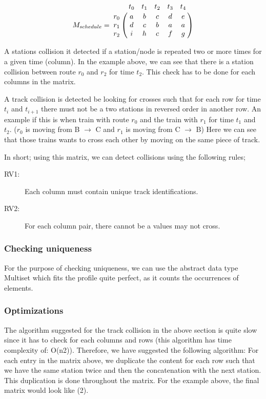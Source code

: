 \documentclass[10pt,a4paper]{article}
\begin{document}
\begin{equation}
M_{schedule} = \bordermatrix{
                    ~ & t_0 & t_1 & t_2 & t_3 & t_4 \cr
                  r_0 & a   & b   & c   & d   & e\cr
                  r_1 & d   & c   & b   & a   & a\cr
                  r_2 & i   & h   & c   & f   & g}
\end{equation}

A stations collision it detected if a station/node is repeated two or more times for a given time (column).
In the example above, we can see that there is a station collision between route $r_0$ and $r_2$ for time $t_2$.
This check has to be done for each columns in the matrix.
 
A track collision is detected be looking for crosses such that for each row for time $t_i$ and $t_{i+1}$ there must not be a two stations in reversed order in another row.
An example if this is when train with route $r_0$ and the train with $r_1$ for time $t_1$ and $t_2$. ($r_0$ is moving from B $\rightarrow$ C and $r_1$ is moving from C $\rightarrow$ B) Here we can see that those trains wants to cross each other by moving on the same piece of track.  

In short; using this matrix, we can detect collisions using the following rules;

\begin{description}
  \item[RV1:] Each column must contain unique track identifications.
  \item[RV2:] For each column pair, there cannot be a values may not cross.
\end{description}

\subsubsection{Checking uniqueness}
For the purpose of checking uniqueness, we can use the abstract data type Multiset which fits the profile quite perfect, as it counts the occurrences of elements. 
\subsubsection{Optimizations}
 
The algorithm suggested for the track collision in the above section is quite slow since it has to check for each columns and rows (this algorithm has time complexity of: O(n2)).
Therefore, we have suggested the following algorithm:
For each entry in the matrix above, we duplicate the content for each row such that we have the same station twice and then the concatenation with the next station. This duplication is done throughout the matrix. For the example above, the final matrix would look like (2).
\end{document}
